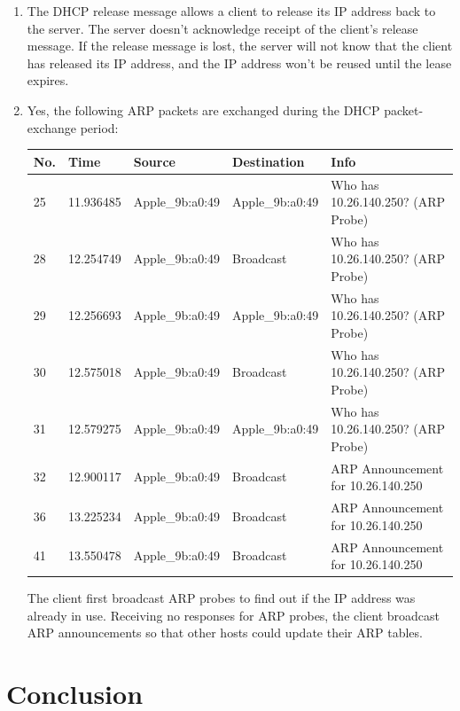 \documentclass{article}
\begin{document}
\begin{enumerate}
    \item The DHCP release message allows a client to release its IP address back to the server. The server doesn't acknowledge receipt of the client's release message. If the release message is lost, the server will not know that the client has released its IP address, and the IP address won't be reused until the lease expires.
    
    \item Yes, the following ARP packets are exchanged during the DHCP packet-exchange period:

    \begin{tabular}{@{}lllll@{}}
        \toprule
        No. & Time      & Source          & Destination     & Info                               \\ \midrule
        25  & 11.936485 & Apple\_9b:a0:49 & Apple\_9b:a0:49 & Who has 10.26.140.250? (ARP Probe) \\
        28  & 12.254749 & Apple\_9b:a0:49 & Broadcast       & Who has 10.26.140.250? (ARP Probe) \\
        29  & 12.256693 & Apple\_9b:a0:49 & Apple\_9b:a0:49 & Who has 10.26.140.250? (ARP Probe) \\
        30  & 12.575018 & Apple\_9b:a0:49 & Broadcast       & Who has 10.26.140.250? (ARP Probe) \\
        31  & 12.579275 & Apple\_9b:a0:49 & Apple\_9b:a0:49 & Who has 10.26.140.250? (ARP Probe) \\
        32  & 12.900117 & Apple\_9b:a0:49 & Broadcast       & ARP Announcement for 10.26.140.250 \\
        36  & 13.225234 & Apple\_9b:a0:49 & Broadcast       & ARP Announcement for 10.26.140.250 \\
        41  & 13.550478 & Apple\_9b:a0:49 & Broadcast       & ARP Announcement for 10.26.140.250 \\ \bottomrule
    \end{tabular}

    The client first broadcast ARP probes to find out if the IP address was already in use. Receiving no responses for ARP probes, the client broadcast ARP announcements so that other hosts could update their ARP tables.
\end{enumerate}


\section{Conclusion}
\end{document}
